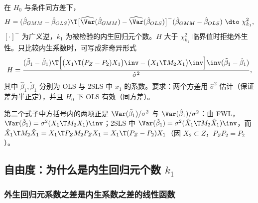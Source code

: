 \begin{thm}\label{thm:U09-hausman}
在 $H_0$ 与条件同方差下，
\[
H=(\hat\beta_{GMM}-\hat\beta_{OLS})\T\big[\widehat{\Var}(\hat\beta_{GMM})-\widehat{\Var}(\hat\beta_{OLS})\big]^{-}(\hat\beta_{GMM}-\hat\beta_{OLS})\ \dto\ \chi^2_{k_1},
\]
$[\cdot]^{-}$ 为广义逆，$k_1$ 为被检验的内生回归元个数。$H$ 大于 $\chi^2_{k_1}$ 临界值时拒绝外生性。只比较内生系数时，可写成非奇异形式
\[
H=\frac{(\tilde\beta_1-\hat\beta_1)\T\Big[\big(X_1\T(P_Z-P_2)X_1\big)\inv-\big(X_1\T M_2X_1\big)\inv\Big]\inv(\tilde\beta_1-\hat\beta_1)}{\hat\sigma^2},
\]
其中 $\hat\beta_1,\tilde\beta_1$ 分别为 OLS 与 2SLS 中 $x_1$ 的系数。要求：两个方差用 $\hat\sigma^2$ 估计（保证差为半正定），并且 $H_0$ 下 OLS 有效（同方差）。
\end{thm}
第二个式子中方括号内的两项正是 $\Var(\tilde\beta_1)/\sigma^2$ 与 $\Var(\hat\beta_1)/\sigma^2$：由 FWL，$\Var(\hat\beta_1)=\sigma^2(X_1\T M_2X_1)\inv$；2SLS 中 $\Var(\tilde\beta_1)=\sigma^2(\hat X_1\T M_2\hat X_1)\inv$，而 $\hat X_1\T M_2\hat X_1=X_1\T P_ZM_2P_ZX_1=X_1\T(P_Z-P_2)X_1$（因 $X_2\subset Z$，$P_ZP_2=P_2$）。

\subsection{自由度：为什么是内生回归元个数 \texorpdfstring{$k_1$}{k1}}

\subsubsection{外生回归元系数之差是内生系数之差的线性函数}

